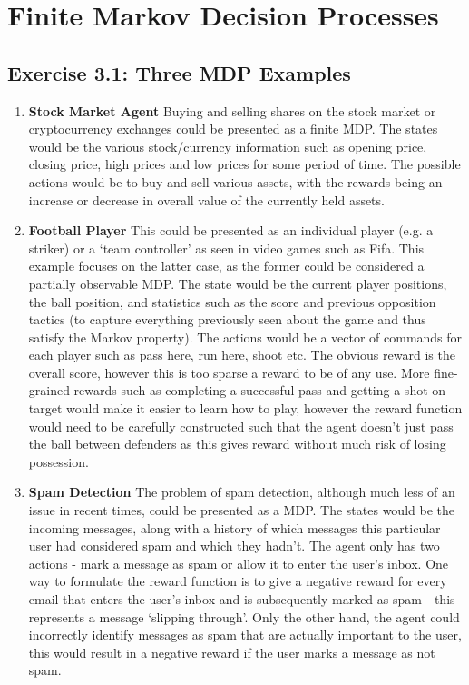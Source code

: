 \section{Finite Markov Decision Processes}

\subsection*{Exercise 3.1: Three MDP Examples}

\begin{enumerate}
	\item \textbf{Stock Market Agent} Buying and selling shares on the stock market or cryptocurrency exchanges could be presented as a finite MDP. The states would be the various stock/currency information such as opening price, closing price, high prices and low prices for some period of time. The possible actions would be to buy and sell various assets, with the rewards being an increase or decrease in overall value of the currently held assets.
	\item \textbf{Football Player} This could be presented as an individual player (e.g. a striker) or a `team controller' as seen in video games such as Fifa. This example focuses on the latter case, as the former could be considered a partially observable MDP. The state would be the current player positions, the ball position, and statistics such as the score and previous opposition tactics (to capture everything previously seen about the game and thus satisfy the Markov property). The actions would be a vector of commands for each player such as pass here, run here, shoot etc. The obvious reward is the overall score, however this is too sparse a reward to be of any use. More fine-grained rewards such as completing a successful pass and getting a shot on target would make it easier to learn how to play, however the reward function would need to be carefully constructed such that the agent doesn't just pass the ball between defenders as this gives reward without much risk of losing possession.
	\item \textbf{Spam Detection} The problem of spam detection, although much less of an issue in recent times, could be presented as a MDP. The states would be the incoming messages, along with a history of which messages this particular user had considered spam and which they hadn't. The agent only has two actions - mark a message as spam or allow it to enter the user's inbox. One way to formulate the reward function is to give a negative reward for every email that enters the user's inbox and is subsequently marked as spam - this represents a message `slipping through'. Only the other hand, the agent could incorrectly identify messages as spam that are actually important to the user, this would result in a negative reward if the user marks a message as not spam.   
\end{enumerate}